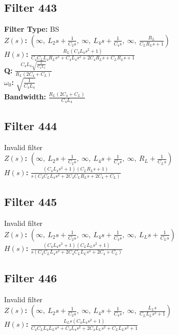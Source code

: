 \documentclass{article}
\begin{document}
\subsection*{Filter 443}
\textbf{Filter Type:} BS \\ 
\textbf{$Z(s)$:} $\left( \infty, \  L_{2} s + \frac{1}{C_{2} s}, \  \infty, \  L_{4} s + \frac{1}{C_{4} s}, \  \infty, \  \frac{R_{L}}{C_{L} R_{L} s + 1}\right)$ \\ 
\textbf{$H(s)$:} $\frac{R_{L} \left(C_{4} L_{4} s^{2} + 1\right)}{C_{4} C_{L} L_{4} R_{L} s^{3} + C_{4} L_{4} s^{2} + 2 C_{4} R_{L} s + C_{L} R_{L} s + 1}$ \\ 
\textbf{Q:} $\frac{C_{4} L_{4} \sqrt{\frac{1}{C_{4} L_{4}}}}{R_{L} \left(2 C_{4} + C_{L}\right)}$ \\ 
\textbf{$\omega_0$:} $\sqrt{\frac{1}{C_{4} L_{4}}}$ \\ 
\textbf{Bandwidth:} $\frac{R_{L} \left(2 C_{4} + C_{L}\right)}{C_{4} L_{4}}$ \\ 
\subsection*{Filter 444}
Invalid filter \\ 
\textbf{$Z(s)$:} $\left( \infty, \  L_{2} s + \frac{1}{C_{2} s}, \  \infty, \  L_{4} s + \frac{1}{C_{4} s}, \  \infty, \  R_{L} + \frac{1}{C_{L} s}\right)$ \\ 
\textbf{$H(s)$:} $\frac{\left(C_{4} L_{4} s^{2} + 1\right) \left(C_{L} R_{L} s + 1\right)}{s \left(C_{4} C_{L} L_{4} s^{2} + 2 C_{4} C_{L} R_{L} s + 2 C_{4} + C_{L}\right)}$ \\ 
\subsection*{Filter 445}
Invalid filter \\ 
\textbf{$Z(s)$:} $\left( \infty, \  L_{2} s + \frac{1}{C_{2} s}, \  \infty, \  L_{4} s + \frac{1}{C_{4} s}, \  \infty, \  L_{L} s + \frac{1}{C_{L} s}\right)$ \\ 
\textbf{$H(s)$:} $\frac{\left(C_{4} L_{4} s^{2} + 1\right) \left(C_{L} L_{L} s^{2} + 1\right)}{s \left(C_{4} C_{L} L_{4} s^{2} + 2 C_{4} C_{L} L_{L} s^{2} + 2 C_{4} + C_{L}\right)}$ \\ 
\subsection*{Filter 446}
Invalid filter \\ 
\textbf{$Z(s)$:} $\left( \infty, \  L_{2} s + \frac{1}{C_{2} s}, \  \infty, \  L_{4} s + \frac{1}{C_{4} s}, \  \infty, \  \frac{L_{L} s}{C_{L} L_{L} s^{2} + 1}\right)$ \\ 
\textbf{$H(s)$:} $\frac{L_{L} s \left(C_{4} L_{4} s^{2} + 1\right)}{C_{4} C_{L} L_{4} L_{L} s^{4} + C_{4} L_{4} s^{2} + 2 C_{4} L_{L} s^{2} + C_{L} L_{L} s^{2} + 1}$ \\ 
\end{document}
